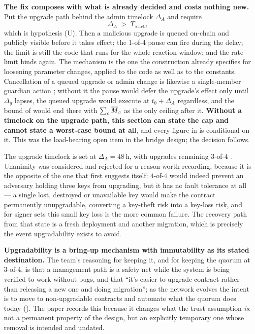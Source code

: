 \begin{remark}
\textbf{The fix composes with what is already decided and costs nothing new.} Put the upgrade path
behind the admin timelock $\Delta_A$ and require
\[
\Delta_A \;>\; T_{\mathrm{react}},
\]
which is hypothesis (U). Then a malicious upgrade is queued on-chain and publicly visible before it
takes effect; the 1-of-4 pause can fire during the delay; the limit is still the code that runs for
the whole reaction window; and the rate limit binds again. The mechanism is the one the construction
already specifies for loosening parameter changes, applied to the code as well as to the constants.
Cancellation of a queued upgrade or admin change is likewise a single-member guardian action
; without it the pause would defer the upgrade's effect
only until $\Delta_g$ lapses, the queued upgrade would execute at $t_0 + \Delta_A$ regardless, and
the bound of  would end there with $\sum_c \overline{M}_{c}$ as the only ceiling
after it.
\textbf{Without a timelock on the upgrade path, this section can state the cap and cannot state a
worst-case bound at all}, and every figure in  is conditional on it. This was
the load-bearing open item in the bridge design; the decision follows. \planned
\begin{remark}
\label{rem:timelock-decided}
The upgrade timelock is set at $\Delta_A = \qty{48}{\hour}$, with upgrades remaining $3$-of-$4$
. Unanimity was considered and rejected for a
reason worth recording, because it is the opposite of the one that first suggests itself: $4$-of-$4$
would indeed prevent an adversary holding three keys from upgrading, but it has no fault tolerance
at all --- a single lost, destroyed or unavailable key would make the contract permanently
unupgradable, converting a key-theft risk into a key-loss risk, and for signer sets this small key
loss is the more common failure. The recovery path from that state is a fresh deployment and another
migration, which is precisely the event upgradability exists to avoid.

\textbf{Upgradability is a bring-up mechanism with immutability as its stated destination.} The
team's reasoning for keeping it, and for keeping the quorum at 3-of-4, is that a management path is a
safety net while the system is being verified to work without bugs, and that ``it's easier to upgrade
contract rather than releasing a new one and doing migration''; as the network evolves the intent is
to move to non-upgradable contracts and automate what the quorum does today
 (\vision). The paper records this because it changes what
the trust assumption \emph{is}: not a permanent property of the design, but an explicitly temporary
one whose removal is intended and undated.


\end{remark}
\end{remark}
